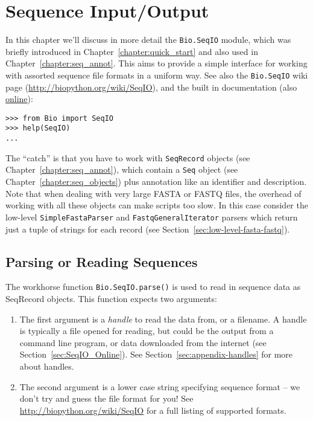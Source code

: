 \chapter{Sequence Input/Output}
\label{chapter:seqio}

In this chapter we'll discuss in more detail the \verb|Bio.SeqIO| module, which was briefly introduced in Chapter~\ref{chapter:quick_start} and also used in Chapter~\ref{chapter:seq_annot}. This aims to provide a simple interface for working with assorted sequence file formats in a uniform way.
See also the \verb|Bio.SeqIO| wiki page (\url{http://biopython.org/wiki/SeqIO}), and the built in documentation (also \href{http://biopython.org/DIST/docs/api/Bio.SeqIO-module.html}{online}):

\begin{verbatim}
>>> from Bio import SeqIO
>>> help(SeqIO)
...
\end{verbatim}

The ``catch'' is that you have to work with \verb|SeqRecord| objects (see Chapter~\ref{chapter:seq_annot}), which contain a \verb|Seq| object (see Chapter~\ref{chapter:seq_objects}) plus annotation like an identifier and description.
Note that when dealing with very large FASTA or FASTQ files, the overhead of working with all these objects can make scripts too slow.
In this case consider the low-level \verb|SimpleFastaParser| and \verb|FastqGeneralIterator| parsers which return just a tuple of strings for each record (see Section~\ref{sec:low-level-fasta-fastq}).

\section{Parsing or Reading Sequences}
\label{sec:Bio.SeqIO-input}

The workhorse function \verb|Bio.SeqIO.parse()| is used to read in sequence data as SeqRecord objects.  This function expects two arguments:

\begin{enumerate}
\item The first argument is a \textit{handle} to read the data from, or a filename. A handle is typically a file opened for reading, but could be the output from a command line program, or data downloaded from the internet (see Section~\ref{sec:SeqIO_Online}).  See Section~\ref{sec:appendix-handles} for more about handles.
\item The second argument is a lower case string specifying sequence format -- we don't try and guess the file format for you!  See \url{http://biopython.org/wiki/SeqIO} for a full listing of supported formats.
\end{enumerate}

